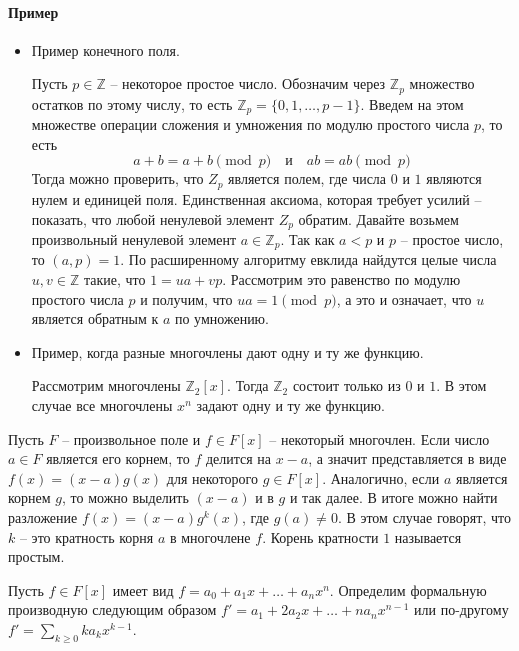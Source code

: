 \paragraph{Пример}
\begin{itemize}
\item Пример конечного поля.

Пусть $p\in \mathbb Z$ -- некоторое простое число.
Обозначим через $\mathbb Z_p$ множество остатков по этому числу, то есть $\mathbb Z_p = \{0, 1, \ldots, p-1\}$.
Введем на этом множестве операции сложения и умножения по модулю простого числа $p$, то есть
\[
a + b = a + b\pmod p\quad \text{и}\quad a b = ab \pmod p
\]
Тогда можно проверить, что $Z_p$ является полем, где числа $0$ и $1$ являются нулем и единицей поля.
Единственная аксиома, которая требует усилий -- показать, что любой ненулевой элемент $Z_p$ обратим.
Давайте возьмем произвольный ненулевой элемент $a\in \mathbb Z_p$.
Так как $ a < p$ и $p$ -- простое число, то $(a, p) =1$.
По расширенному алгоритму евклида найдутся целые числа $u, v\in\mathbb Z$ такие, что $1 = u a + vp$.
Рассмотрим это равенство по модулю простого числа $p$ и получим, что
$u a = 1 \pmod p$, а это и означает, что $u$ является обратным к $a$ по умножению.

\item Пример, когда разные многочлены дают одну и ту же функцию.

Рассмотрим многочлены $\mathbb Z_2[x]$.
Тогда $\mathbb Z_2$ состоит только из $0$ и $1$.
В этом случае все многочлены $x^n$ задают одну и ту же функцию.
\end{itemize}

\begin{definition}
 Пусть $F$ -- произвольное поле и $f\in F[x]$ -- некоторый многочлен.
 Если число $a\in F$ является его корнем, то $f$ делится на $x - a$, а значит представляется в виде $f(x) = (x - a) g(x)$ для некоторого $g\in F[x]$.
 Аналогично, если $a$ является корнем $g$, то можно выделить $(x - a)$ и в $g$ и так далее.
 В итоге можно найти разложение $f(x) = (x - a) g^k(x)$, где $g(a) \neq 0$.
 В этом случае говорят, что $k$ -- это кратность корня $a$ в многочлене $f$.
 Корень кратности $1$ называется простым.
\end{definition}


\begin{definition}
Пусть $f\in F[x]$ имеет вид $f = a_0 + a_1 x + \ldots + a_n x^n$.
Определим формальную производную следующим образом $f' = a_1 + 2a_2 x+\ldots + na_n x^{n-1}$ или по-другому $f'=\sum_{k\geqslant 0} k a_k x^{k-1}$.
\end{definition}

